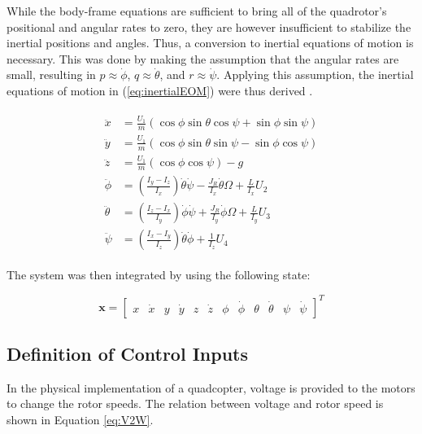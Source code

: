 \documentclass[12pt]{article}
\begin{document}
While the body-frame equations are sufficient to bring all of the quadrotor's positional and angular rates to zero, they are however insufficient to stabilize the inertial positions and angles. Thus, a conversion to inertial equations of motion is necessary. This was done by making the assumption that the angular rates are small, resulting in $p \approx \dot{\phi}$, $q \approx \dot{\theta}$, and $r \approx \dot{\psi}$. Applying this assumption, the inertial equations of motion in (\ref{eq:inertialEOM}) were thus derived \cite{SudhirSwarup}.

\begin{centering}
\begin{align} \label{eq:inertialEOM}
\begin{split}
\ddot{x} &= \frac{U_1}{m}\left(\cos\phi\sin\theta\cos\psi + \sin\phi\sin\psi\right)\\
\ddot{y} &= \frac{U_1}{m}\left(\cos\phi\sin\theta\sin\psi - \sin\phi\cos\psi\right) \\
\ddot{z} &= \frac{U_1}{m}\left(\cos\phi\cos\psi\right) -g\\
\ddot{\phi} &= \left(\frac{I_y - I_z}{I_x}\right)\dot{\theta}\dot{\psi} - \frac{J_R}{I_x}\dot{\theta}\Omega + \frac{L}{I_x}U_2\\
\ddot{\theta} &= \left(\frac{I_z-I_x}{I_y}\right)\dot{\phi}\dot{\psi} + \frac{J_R}{I_y}\dot{\phi}\Omega + \frac{L}{I_y}U_3\\
\ddot{\psi} &= \left( \frac{I_x - I_y}{I_z} \right)\dot{\theta}\dot{\phi} + \frac{1}{I_z}U_4
\end{split}
\end{align}
\end{centering}

The system was then integrated by using the following state:

\begin{centering}
\begin{equation}
\bm x = \begin{bmatrix}
x & \dot{x} & y & \dot{y} & z & \dot{z} & \phi & \dot{\phi} & \theta & \dot{\theta} & \psi & \dot{\psi}
\end{bmatrix}^T
\end{equation}
\end{centering}


\subsection{Definition of Control Inputs}
In the physical implementation of a quadcopter, voltage is provided to the motors to change the rotor speeds. The relation between voltage and rotor speed is shown in Equation \ref{eq:V2W}.
\end{document}
